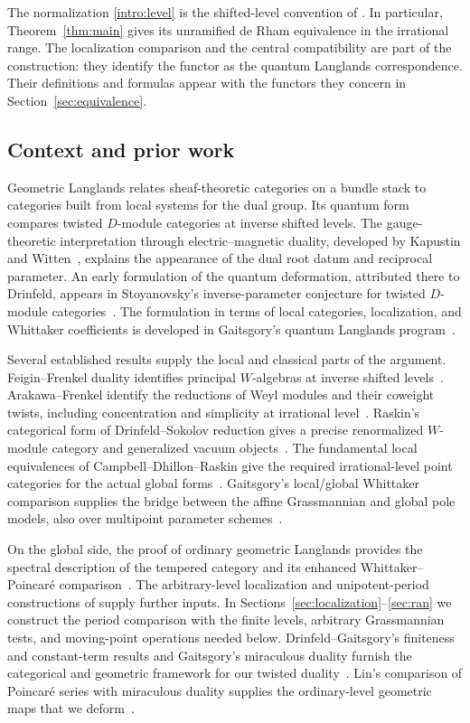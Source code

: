 \documentclass[11pt]{article}
\numberwithin{equation}{section}
\theoremstyle{definition}
\theoremstyle{remark}
\begin{document}
The normalization \eqref{intro:level} is the shifted-level convention of
\cite[Section~1.1.5, Conjecture~1]{BogdanovaBetti}. In particular,
Theorem~\ref{thm:main} gives its unramified de Rham equivalence in the
irrational range. The localization comparison and the central compatibility
are part of the construction: they identify the functor as the quantum
Langlands correspondence. Their definitions and formulas appear with the
functors they concern in Section~\ref{sec:equivalence}.

\subsection{Context and prior work}

Geometric Langlands relates sheaf-theoretic categories on a bundle stack to
categories built from local systems for the dual group. Its quantum form
compares twisted $D$-module categories at inverse shifted levels. The
gauge-theoretic interpretation through electric--magnetic duality, developed
by Kapustin and Witten~\cite{KapustinWitten}, explains the appearance of the
dual root datum and reciprocal parameter. An early formulation of the
quantum deformation, attributed there to Drinfeld, appears in Stoyanovsky's
inverse-parameter conjecture for twisted $D$-module
categories~\cite[Section~1.3, Conjecture~2]{Stoyanovsky}. The formulation in
terms of local categories, localization, and Whittaker coefficients is
developed in Gaitsgory's quantum Langlands program~\cite{GaitsgoryQGL}.

Several established results supply the local and classical parts of the
argument. Feigin--Frenkel duality identifies principal $W$-algebras at inverse
shifted levels~\cite{FeiginFrenkel}. Arakawa--Frenkel identify the reductions of Weyl modules and
their coweight twists, including concentration and simplicity at irrational
level~\cite{ArakawaFrenkel}. Raskin's categorical form of
Drinfeld--Sokolov reduction gives a precise renormalized $W$-module category
and generalized vacuum objects~\cite{RaskinW}. The fundamental local
equivalences of Campbell--Dhillon--Raskin give the required irrational-level
point categories for the actual global forms~\cite{CDR}. Gaitsgory's
local/global Whittaker comparison supplies the bridge between the affine
Grassmannian and global pole models, also over multipoint parameter
schemes~\cite{GaitsgoryWhit}.

On the global side, the proof of ordinary geometric Langlands provides the
spectral description of the tempered category and its enhanced
Whittaker--Poincar\'e comparison~\cite{GLCI,GLCII,GLCIII,GLCIV,GLCV}.
The arbitrary-level localization and unipotent-period constructions of
\cite{GLCII} supply further inputs. In
Sections~\ref{sec:localization}--\ref{sec:ran} we construct the period
comparison with the finite levels, arbitrary Grassmannian tests, and
moving-point operations needed below.
Drinfeld--Gaitsgory's finiteness and
constant-term results and Gaitsgory's miraculous duality furnish the
categorical and geometric framework for our twisted
duality~\cite{DrinfeldGaitsgoryFiniteness,DrinfeldGaitsgoryCT,GaitsgoryStrange}.
Lin's comparison of Poincar\'e series with miraculous duality supplies the
ordinary-level geometric maps that we deform~\cite{Lin}.
\end{document}

